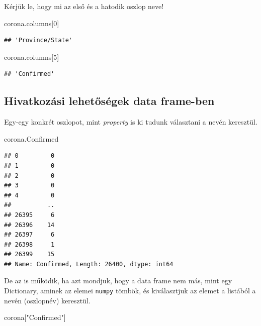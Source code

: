 \documentclass[
]{book}
\newenvironment{Shaded}{\begin{snugshade}}{\end{snugshade}}
\newcommand{\DecValTok}[1]{\textcolor[rgb]{0.00,0.00,0.81}{#1}}
\newcommand{\NormalTok}[1]{#1}
\newcommand{\StringTok}[1]{\textcolor[rgb]{0.31,0.60,0.02}{#1}}
\begin{document}
Kérjük le, hogy mi az első és a hatodik oszlop neve!

\begin{Shaded}
\begin{Highlighting}[]
\NormalTok{corona.columns[}\DecValTok{0}\NormalTok{]}
\end{Highlighting}
\end{Shaded}

\begin{verbatim}
## 'Province/State'
\end{verbatim}

\begin{Shaded}
\begin{Highlighting}[]
\NormalTok{corona.columns[}\DecValTok{5}\NormalTok{]}
\end{Highlighting}
\end{Shaded}

\begin{verbatim}
## 'Confirmed'
\end{verbatim}

\subsection{Hivatkozási lehetőségek data frame-ben}\label{hivatkozuxe1si-lehetux151suxe9gek-data-frame-ben}

Egy-egy konkrét oszlopot, mint \emph{property} is ki tudunk választani a nevén keresztül.

\begin{Shaded}
\begin{Highlighting}[]
\NormalTok{corona.Confirmed}
\end{Highlighting}
\end{Shaded}

\begin{verbatim}
## 0         0
## 1         0
## 2         0
## 3         0
## 4         0
##          ..
## 26395     6
## 26396    14
## 26397     6
## 26398     1
## 26399    15
## Name: Confirmed, Length: 26400, dtype: int64
\end{verbatim}

De az is működik, ha azt mondjuk, hogy a data frame nem más, mint egy Dictionary, aminek az elemei \texttt{numpy} tömbök, és kiválasztjuk az elemet a listából a nevén (oszlopnév) keresztül.

\begin{Shaded}
\begin{Highlighting}[]
\NormalTok{corona[}\StringTok{"Confirmed"}\NormalTok{]}
\end{Highlighting}
\end{Shaded}
\end{document}
